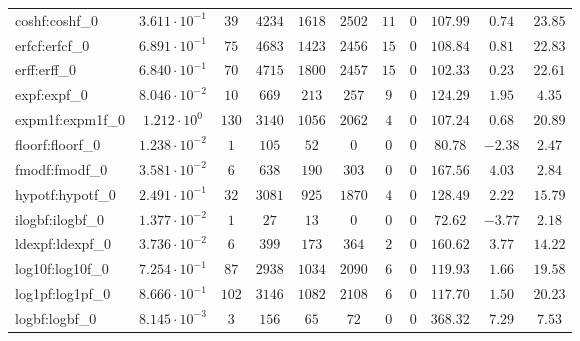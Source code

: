 \begin{tabular}{|l|c|c|c|c|c|c|c|c|c|c|}
coshf:coshf\_0               & $ 3.611 \cdot 10^{-1} $ & $ 39     $ & $ 4234  $ & $ 1618  $ & $ 2502  $ & $ 11  $ & $ 0 $ & $ 107.99      $ & $ 0.74    $ & $ 23.85   $ \\
erfcf:erfcf\_0               & $ 6.891 \cdot 10^{-1} $ & $ 75     $ & $ 4683  $ & $ 1423  $ & $ 2456  $ & $ 15  $ & $ 0 $ & $ 108.84      $ & $ 0.81    $ & $ 22.83   $ \\
erff:erff\_0                 & $ 6.840 \cdot 10^{-1} $ & $ 70     $ & $ 4715  $ & $ 1800  $ & $ 2457  $ & $ 15  $ & $ 0 $ & $ 102.33      $ & $ 0.23    $ & $ 22.61   $ \\
expf:expf\_0                 & $ 8.046 \cdot 10^{-2} $ & $ 10     $ & $ 669   $ & $ 213   $ & $ 257   $ & $ 9   $ & $ 0 $ & $ 124.29      $ & $ 1.95    $ & $ 4.35    $ \\
expm1f:expm1f\_0             & $ 1.212 \cdot 10^{0}  $ & $ 130    $ & $ 3140  $ & $ 1056  $ & $ 2062  $ & $ 4   $ & $ 0 $ & $ 107.24      $ & $ 0.68    $ & $ 20.89   $ \\
floorf:floorf\_0             & $ 1.238 \cdot 10^{-2} $ & $ 1      $ & $ 105   $ & $ 52    $ & $ 0     $ & $ 0   $ & $ 0 $ & $ 80.78       $ & $ -2.38   $ & $ 2.47    $ \\
fmodf:fmodf\_0               & $ 3.581 \cdot 10^{-2} $ & $ 6      $ & $ 638   $ & $ 190   $ & $ 303   $ & $ 0   $ & $ 0 $ & $ 167.56      $ & $ 4.03    $ & $ 2.84    $ \\
hypotf:hypotf\_0             & $ 2.491 \cdot 10^{-1} $ & $ 32     $ & $ 3081  $ & $ 925   $ & $ 1870  $ & $ 4   $ & $ 0 $ & $ 128.49      $ & $ 2.22    $ & $ 15.79   $ \\
ilogbf:ilogbf\_0             & $ 1.377 \cdot 10^{-2} $ & $ 1      $ & $ 27    $ & $ 13    $ & $ 0     $ & $ 0   $ & $ 0 $ & $ 72.62       $ & $ -3.77   $ & $ 2.18    $ \\
ldexpf:ldexpf\_0             & $ 3.736 \cdot 10^{-2} $ & $ 6      $ & $ 399   $ & $ 173   $ & $ 364   $ & $ 2   $ & $ 0 $ & $ 160.62      $ & $ 3.77    $ & $ 14.22   $ \\
log10f:log10f\_0             & $ 7.254 \cdot 10^{-1} $ & $ 87     $ & $ 2938  $ & $ 1034  $ & $ 2090  $ & $ 6   $ & $ 0 $ & $ 119.93      $ & $ 1.66    $ & $ 19.58   $ \\
log1pf:log1pf\_0             & $ 8.666 \cdot 10^{-1} $ & $ 102    $ & $ 3146  $ & $ 1082  $ & $ 2108  $ & $ 6   $ & $ 0 $ & $ 117.70      $ & $ 1.50    $ & $ 20.23   $ \\
logbf:logbf\_0               & $ 8.145 \cdot 10^{-3} $ & $ 3      $ & $ 156   $ & $ 65    $ & $ 72    $ & $ 0   $ & $ 0 $ & $ 368.32      $ & $ 7.29    $ & $ 7.53    $ \\

\end{tabular}
